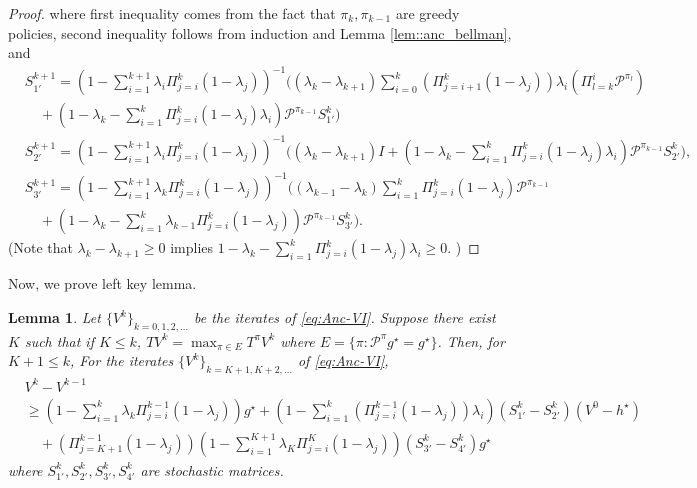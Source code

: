 \documentclass{article} %
\newcommand{\cP}{\mathcal{P}}
\newcommand*{\para}[1]{\left({#1}\right)}
\newtheorem{lemma}{Lemma}
\begin{document}
\begin{proof}
    where first inequality comes from the fact that $\pi_k, \pi_{k-1}$ are greedy policies, second inequality follows from induction and Lemma \ref{lem::anc_bellman}, and 
    \begin{align*}
    &S^{k+1}_{1'} = \para{1-\sum_{i=1}^{k+1} \lambda_i \Pi^{k}_{j=i} (1-\lambda_j)}^{-1} \bigg((\lambda_{k}-\lambda_{k+1})\sum_{i=0}^{k} (\Pi^k_{j=i+1} (1-\lambda_j)) \lambda_{i}\para{\Pi^{i}_{l=k}\cP^{\pi_l}}
    \\& \quad +\para{1-\lambda_k-\sum_{i=1}^{k}  \Pi^{k}_{j=i} (1-\lambda_j)\lambda_i}\cP^{\pi_{k-1}}S_{1'}^k \bigg)
    \\&S^{k+1}_{2'} =\para{1-\sum_{i=1}^{k+1} \lambda_i \Pi^{k}_{j=i} (1-\lambda_j)}^{-1}\bigg((\lambda_{k}-\lambda_{k+1})I+\para{1-\lambda_k-\sum_{i=1}^{k}  \Pi^{k}_{j=i} (1-\lambda_j)\lambda_i}\cP^{\pi_{k-1}}S^{k}_{2'} \bigg),
    \\&S^{k+1}_{3'} = \para{1-\sum_{i=1}^{k+1} \lambda_{k} \Pi^{k}_{j=i} (1-\lambda_j)}^{-1} \bigg((\lambda_{k-1}-\lambda_{k})  \sum_{i=1}^{k} \Pi^{k}_{j=i} (1-\lambda_j)\cP^{\pi_{k-1}}
    \\& \quad +\para{1-\lambda_k-\sum_{i=1}^{k} \lambda_{k-1} \Pi^{k}_{j=i} (1-\lambda_j)}\cP^{\pi_{k-1}}S^k_{3'}\bigg).    
    \end{align*}
     (Note that $\lambda_{k}-\lambda_{k+1} \ge 0$ implies $1-\lambda_k-\sum_{i=1}^{k}  \Pi^{k}_{j=i} (1-\lambda_j)\lambda_i \ge 0$. )

\end{proof}
Now, we prove left key lemma.
\begin{lemma}\label{lem::anc_lower_bd}
Let $\{V^k\}_{k=0, 1,2,\dots}$ be the iterates of \ref{eq:Anc-VI}.  Suppose there exist $K$ such that if $K \le k$,
 $TV^k=\max_{\pi \in E}T^{\pi}V^k $ where $E = \{\pi: \cP^{\pi}g^{\star}= g^{\star}\}$. Then, for $ K+1 \le k$, For the iterates $\{V^k\}_{k=K+1,K+2,\dots}$ of \ref{eq:Anc-VI},
\begin{align*}
    &V^k-V^{k-1} 
    \\&\ge \para{1-\sum_{i=1}^{k} \lambda_k \Pi^{k-1}_{j=i} (1-\lambda_j)}g^{\star}+ \para{1-\sum_{i=1}^{k}  \para{\Pi^{k-1}_{j=i} (1-\lambda_j)}\lambda_i}(S^{k}_{1'} -S^{k}_{2'})(V^0-h^{\star})
    \\& \quad +\para{\Pi^{k-1}_{j=K+1} (1-\lambda_j)}\para{1-\sum_{i=1}^{K+1} \lambda_{K} \Pi^{K}_{j=i} (1-\lambda_j)}(S^{k}_{3'}-S^{k}_{4'})g^{\star}
\end{align*}   
where $S^{k}_{1'},S^{k}_{2'}, S^{k}_{3'},S^{k}_{4'}$ are stochastic matrices.
\end{lemma}
\end{document}
